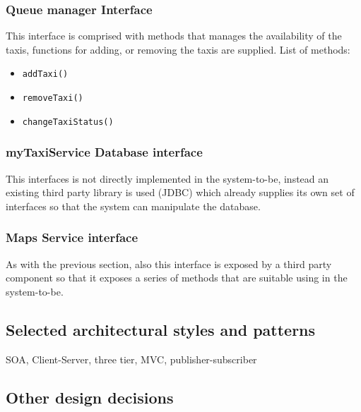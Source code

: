 \subsubsection{Queue manager Interface}
This interface is comprised with methods that manages the availability of the taxis, functions for adding, or removing the taxis are supplied. \newline
List of methods:
\begin{itemize}
	\item \texttt{addTaxi()}
	\item \texttt{removeTaxi()}
	\item \texttt{changeTaxiStatus()}
\end{itemize}
\subsubsection{myTaxiService Database interface}
This interfaces is not directly implemented in the system-to-be, instead an existing third party library is used (JDBC) which already supplies its own set of interfaces so that the system can manipulate the database.
\subsubsection{Maps Service interface}
As with the previous section, also this interface is exposed by a third party component so that it exposes a series of methods that are suitable using in the system-to-be.
\subsection{Selected architectural styles and patterns}
SOA, Client-Server, three tier, MVC, publisher-subscriber
\subsection{Other design decisions}